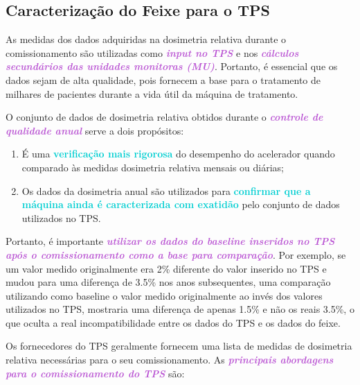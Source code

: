 \documentclass[11pt,a4paper]{article}
\newcounter{exemplo}
\begin{document}
\subsection*{Caracterização do Feixe para o TPS}

	As medidas dos dados adquiridas na dosimetria relativa durante o comissionamento são utilizadas como \textcolor{MediumOrchid}{\textbf{\textit{input no TPS}}} e nos \textcolor{MediumOrchid}{\textbf{\textit{cálculos secundários das unidades monitoras (MU)}}}. Portanto, é essencial que os dados sejam de alta qualidade, pois fornecem a base para o tratamento de milhares de pacientes durante a vida útil da máquina de tratamento.
	
	O conjunto de dados de dosimetria relativa obtidos durante o \textcolor{MediumOrchid}{\textbf{\textit{controle de qualidade anual}}} serve a dois propósitos:
	
	\begin{enumerate}[label=\textcolor{CarnationPink}{\arabic*${}^\circ $}]
		\item É uma \textcolor{DarkTurquoise}{\textbf{verificação mais rigorosa}} do desempenho do acelerador quando comparado às medidas dosimetria relativa mensais ou diárias; 
		\item Os dados da dosimetria anual são utilizados para \textcolor{DarkTurquoise}{\textbf{confirmar que a máquina ainda é caracterizada com exatidão}} pelo conjunto de dados utilizados no TPS.
	\end{enumerate}
	
	Portanto, é importante \textcolor{MediumOrchid}{\textbf{\textit{utilizar os dados do baseline inseridos no TPS após o comissionamento como a base para comparação}}}. Por exemplo, se um valor medido originalmente era 2\% diferente do valor inserido no TPS e mudou para uma diferença de 3.5\%  nos anos subsequentes, uma comparação utilizando como baseline o valor medido originalmente ao invés dos valores utilizados no TPS, mostraria uma diferença de apenas 1.5\% e não os reais 3.5\%, o que oculta a real incompatibilidade entre os dados do TPS e os dados do feixe.

	Os fornecedores do TPS geralmente fornecem uma lista de medidas de dosimetria relativa necessárias para o seu comissionamento. As \textcolor{MediumOrchid}{\textbf{\textit{principais abordagens para o comissionamento do TPS}}} são:
\end{document}

